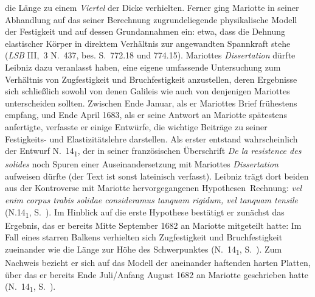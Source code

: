 \pend
\newpage
\pstart\noindent die Länge zu einem \textit{Viertel} der Dicke verhielten.
Ferner ging Mariotte in seiner Abhandlung auf das seiner Berechnung zugrundeliegende physikalische Modell der Festigkeit und auf dessen Grundannahmen ein: etwa, dass die Dehnung elastischer Körper in direktem Verhältnis zur angewandten Spannkraft stehe (\textit{LSB} III,~3 N.~437, bes. S.~772.18 und 774.15).%
\pend%
\pstart%
Mariottes%
\textit{Dissertation} dürfte Leibniz dazu veranlasst haben, eine eigene umfassende Untersuchung zum Verhältnis von Zugfestigkeit und Bruchfestigkeit anzustellen, deren Ergebnisse sich schließlich sowohl von denen Galileis\protect{} wie auch von denjenigen Mariottes\protect{} unterscheiden sollten.
Zwischen Ende Januar, %
als er Mariottes Brief frühestens empfang, und Ende April 1683, als er seine Antwort an Mariotte spätestens anfertigte, verfasste er einige Entwürfe, die wichtige Beiträge zu seiner Festigkeits- und Elastizitätslehre darstellen.
\pend%
\pstart%
Als erster entstand wahrscheinlich der Entwurf N.~14\textsubscript{1}, der in seiner französischen Überschrift \textit{De la resistence des solides} noch Spuren einer Auseinandersetzung mit Mariottes \textit{Dissertation} aufweisen dürfte (der Text ist sonst lateinisch verfasst).
Leibniz trägt dort beiden aus der Kontroverse mit Mariotte hervorgegangenen \glqq Hypothesen\grqq\ Rechnung:
\textit{vel enim corpus trabis solidae consideramus tanquam rigidum, vel tanquam tensile} (N.14\textsubscript{1}, S.~).
Im Hinblick auf die erste Hypothese bestätigt er zunächst das Ergebnis, das er bereits Mitte September 1682 an Mariotte mitgeteilt hatte:
Im Fall eines starren Balkens verhielten sich Zugfestigkeit und Bruchfestigkeit zueinander wie die Länge zur Höhe des Schwerpunktes (N.~14\textsubscript{1}, S.~).
Zum Nachweis bezieht er sich auf das Modell der aneinander haftenden harten Platten, über das er bereits Ende Juli/Anfang August 1682 an Mariotte geschrieben hatte (N.~14\textsubscript{1}, S.~).
